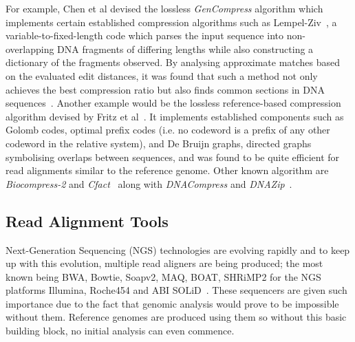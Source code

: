 \documentclass{csfyp}
\begin{document}
For example, Chen et al devised the lossless {\textit{GenCompress}} algorithm which implements certain established compression algorithms such as Lempel-Ziv~\cite{gencompress}, a variable-to-fixed-length code which parses the input sequence into non-overlapping DNA fragments of differing lengths while also constructing a dictionary of the fragments observed.    By analysing approximate matches based on the evaluated edit distances, it was found that such a method not only achieves the best compression ratio but also finds common sections in DNA sequences~\cite{gencompress}.  Another example would be the lossless reference-based compression algorithm devised by Fritz et al~\cite{refcompression}.  It implements established components such as Golomb codes, optimal prefix codes (i.e. no codeword is a prefix of any other codeword in the relative system), and De Bruijn graphs, directed graphs symbolising overlaps between sequences, and was found to be quite efficient for read alignments similar to the reference genome.  Other known algorithm are {\textit{Biocompress-2}} and {\textit{Cfact}}~\cite{gencompress} along with {\textit{DNACompress}} and {\textit{ DNAZip}}~\cite{refcompression}.          

\subsection{Read Alignment Tools}\vspace{-2ex}
Next-Generation Sequencing (NGS) technologies are evolving rapidly and to keep up with this evolution, multiple read aligners are being produced; the most known being BWA, Bowtie, Soapv2, MAQ, BOAT, SHRiMP2 for the NGS platforms Illumina, Roche454 and ABI SOLiD~\cite{bwtransform, popgen, cgreads}.  These sequencers are given such importance due to the fact that genomic analysis would prove to be impossible without them.  Reference genomes are produced using them so without this basic building block, no initial analysis can even commence.     
\end{document}
